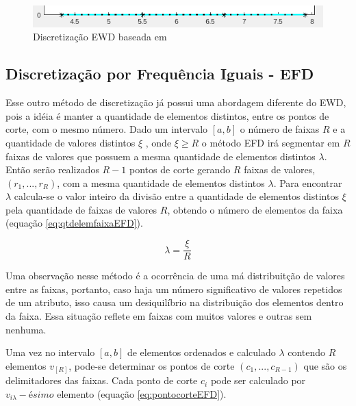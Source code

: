 \begin{figure}[h] 
        \centering
        \includegraphics[scale=0.8]{figs/ewd_fisheriris_col1.png}
        \caption[Discretização EWD]{Discretização EWD baseada em \cite{LOPES2014}}%
        \label{fig:faixasEWD}
\end{figure}

\subsection{Discretização por Frequência Iguais - EFD}\label{cap:refTeor:subsec:efd}

Esse outro método de discretização já possui uma abordagem diferente do EWD, pois a idéia é manter a quantidade de elementos distintos, entre os pontos de corte, com o mesmo número. Dado um intervalo ${[a,b]}$ o número de faixas ${R}$ e a quantidade de valores distintos ${\xi}$ , onde ${\xi \geqslant R}$ o método EFD irá segmentar em  ${R}$ faixas de valores que possuem a mesma quantidade de elementos distintos ${\lambda}$. Então serão realizados ${R-1}$ pontos de corte gerando ${R}$ faixas de valores, ${(r_1,...,r_R)}$, com a mesma quantidade de elementos distintos ${\lambda}$. Para encontrar ${\lambda}$ calcula-se o valor inteiro da divisão entre a quantidade de elementos distintos ${\xi}$ pela quantidade de faixas de valores ${R}$, obtendo o número de elementos da faixa (equação \ref{eq:qtdelemfaixaEFD}).

\begin{equation}
\lambda = \frac{\xi}{R}
 \label{eq:qtdelemfaixaEFD}
\end{equation}

Uma observação nesse método é a ocorrência de uma má distribuitção de valores entre as faixas, portanto, caso haja um número significativo de valores repetidos de um atributo, isso causa um desiquilíbrio na distribuição dos elementos dentro da faixa. Essa situação reflete em faixas com muitos valores e outras sem nenhuma. 

Uma vez no intervalo ${[a,b]}$ de elementos ordenados e calculado ${\lambda}$ contendo ${R}$ elementos ${v_{[R]}}$,  pode-se determinar os pontos de corte ${(c_1,...,c_{R-1})}$ que são os delimitadores das faixas. Cada ponto de corte ${c_i}$ pode ser calculado por ${v_{i\lambda}-ésimo}$ elemento (equação \ref{eq:pontocorteEFD}).

